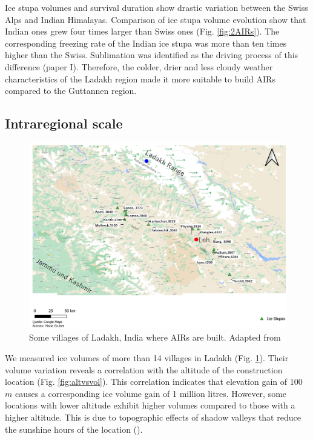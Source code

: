 Ice stupa volumes and survival duration show drastic variation between the Swiss Alps and Indian Himalayas.
Comparison of ice stupa volume evolution show that Indian ones grew four times larger than Swiss ones (Fig.
\ref{fig:2AIRs}). The corresponding freezing rate of the Indian ice stupa was more than ten times higher than the
Swiss. Sublimation was identified as the driving process of this difference (paper I). Therefore, the
colder, drier and less cloudy weather characteristics of the Ladakh region made it more suitable to build AIRs
compared to the Guttannen region. 

\subsection{Intraregional scale}

\begin{figure}[htb]
	\includegraphics[width=\textwidth]{figs/ISC_villages}
  \caption{Some villages of Ladakh, India where AIRs are built. Adapted from
  \citep{mariagruberIceStupasLadakh2022}}
	\label{fig:villages}
\end{figure}

We measured ice volumes of more than 14 villages in Ladakh (Fig. \ref{fig:villages}). Their volume variation
reveals a correlation with the altitude of the construction location (Fig. \ref{fig:altvsvol}). This correlation
indicates that elevation gain of 100 $m$ causes a corresponding ice volume gain of 1 million litres. However,
some locations with lower altitude exhibit higher volumes compared to those with a higher altitude. This is due
to topographic effects of shadow valleys that reduce the sunshine hours of the location (\cite{mariagruberIceStupasLadakh2022}).

